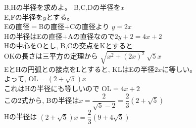 B,Hの半径を求めよ。
\enthm
B,C,Dの半径を$x$\\
E,Fの半径を$y$とする。\\
Eの直径$=$Bの直径+Cの直径より $y=2x$\\
Hの半径はEの直径+Aの直径なので$2y+2=4x+2$\\
Hの中心をOとし, B,Cの交点をKとすると\\
OKの長さは三平方の定理から $\sqrt{x^2+(2x)^2}~\sqrt{5}x$\\
EとHの円弧との接点をLとすると, KLはEの半径$2x$に等しい。\\
よって, OL$=(2+\sqrt{5})x$\\
これはHの半径にも等しいので OL$=4x+2$\\
この2式から, Bの半径は$x=\dfrac{2}{\sqrt{5}-2}=\dfrac{2}{3}(2+\sqrt{5})$\\
Hの半径は $(2+\sqrt{5})x=\dfrac{2}{3}(9+4\sqrt{5})$ 
